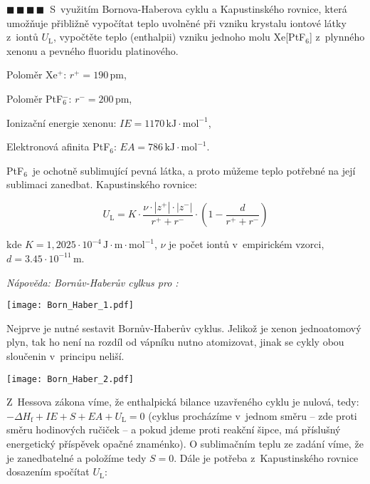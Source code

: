 \documentclass{book}
\let\ch\undefined
\newcommand{\ctyri}{$\blacksquare \, \blacksquare \, \blacksquare \, \blacksquare \; \; $}
\renewenvironment{quotation}{\par}{\par} %
\begin{document}
\hrulefill %
\begin{quotation}
\ctyri S~využitím Bornova-Haberova cyklu a Kapustinského rovnice, která 
umožňuje přibližně vypočítat teplo uvolněné při vzniku krystalu iontové látky
z~iontů $U_{\mathrm{L}}$, vypočtěte teplo (enthalpii) vzniku jednoho molu Xe{[}PtF$_{6}${]}
z~plynného xenonu a pevného fluoridu platinového.

Poloměr Xe$^{+}$: $r^{+}=190\,\mathrm{pm}$, 

Poloměr PtF$_{6}^{-}$: $r^{-}=200\,\mathrm{pm}$,

Ionizační energie xenonu: $IE=1170\,\mathrm{kJ\cdot mol^{-1}}$, 

Elektronová afinita PtF$_{6}$: $EA=786\,\mathrm{kJ\cdot mol^{-1}}$. 

\noindent\-PtF$_{6}$~je ochotně sublimující pevná látka, a proto můžeme teplo potřebné
na její sublimaci zanedbat. Kapustinského rovnice: 

\[
U_{\mathrm{L}}=K\cdot\frac{\nu\cdot|z^{+}|\cdot|z^{-}|}{r^{+}+r^{-}}\cdot\left(1-\frac{d}{r^{+}+r^{-}}\right)
\]

kde $K=1,2025\cdot10^{-4}\,\mathrm{J\cdot m\cdot mol^{-1}}$, $\nu$
je počet iontů v~empirickém vzorci, $d=3.45\cdot10^{-11}\,\mathrm{m}$. 

\textit{Nápověda: Bornův-Haberův cylkus pro \ch{CaBr2}:}
\begin{center}
\texttt{[image: Born\_Haber\_1.pdf]}
\end{center}
\end{quotation} \dotfill \par 

\newpage %
Nejprve je nutné sestavit Bornův-Haberův cyklus. Jelikož je xenon
jednoatomový plyn, tak ho není na rozdíl od vápníku nutno atomizovat,
jinak se cykly obou sloučenin v~principu neliší.

\begin{center}
\texttt{[image: Born\_Haber\_2.pdf]}
\end{center}
Z~Hessova zákona víme, že enthalpická bilance uzavřeného cyklu je nulová,
tedy: $-\Delta H_{\mathrm{f}}+IE+S+EA+U_{\mathrm{L}}=0$ (cyklus procházíme v~jednom
směru -- zde proti směru hodinových ručiček -- a pokud jdeme proti
reakční šipce, má příslušný energetický příspěvek opačné znaménko).
O sublimačním teplu ze zadání víme, že je zanedbatelné a položíme
tedy $S=0$. Dále je potřeba z~Kapustinského rovnice dosazením spočítat
$U_{\mathrm{L}}$:
\end{document}
